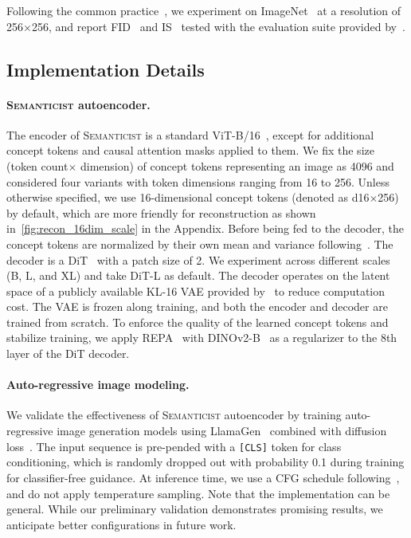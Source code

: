 \documentclass[10pt,twocolumn,letterpaper]{article}
\DeclareRobustCommand{\modelname}{\textsc{Semanticist}\xspace}
\begin{document}
Following the common practice~\cite{mar}, we experiment on ImageNet~\cite{imagenet} at a resolution of 256$\times$256, and report FID~\cite{fid} and IS~\cite{is} tested with the evaluation suite provided by~\cite{dhariwal2021diffusion}.

\subsection{Implementation Details}

\paragraph{\modelname autoencoder.}
The encoder of \modelname is a standard ViT-B/16~\cite{vit}, except for additional concept tokens and causal attention masks applied to them.
We fix the size (token count$\times$ dimension) of concept tokens representing an image as 4096 and considered four variants with token dimensions ranging from 16 to 256. 
Unless otherwise specified, we use 16-dimensional concept tokens (denoted as d16$\times$256) by default, which are more friendly for reconstruction as shown in~\cref{fig:recon_16dim_scale} in the Appendix.
Before being fed to the decoder, the concept tokens are normalized by their own mean and variance following~\cite{RCG}.
The decoder is a DiT~\cite{dit} with a patch size of 2. 
We experiment across different scales (B, L, and XL) and take DiT-L as default. 
The decoder operates on the latent space of a publicly available KL-16 VAE provided by~\cite{mar} to reduce computation cost. 
The VAE is frozen along training, and both the encoder and decoder are trained from scratch.
To enforce the quality of the learned concept tokens and stabilize training, we apply REPA~\cite{repa} with DINOv2-B~\cite{dinov2} as a regularizer to the 8th layer of the DiT decoder.

\paragraph{Auto-regressive image modeling.}
We validate the effectiveness of \modelname autoencoder by training auto-regressive image generation models using LlamaGen~\cite{llamagen} combined with diffusion loss~\cite{mar}. 
The input sequence is pre-pended with a \texttt{[CLS]} token for class conditioning, which is randomly dropped out with probability 0.1 during training for classifier-free guidance. 
At inference time, we use a CFG schedule following~\cite{mar,muse}, and do not apply temperature sampling. 
Note that the implementation can be general. 
While our preliminary validation demonstrates promising results, we anticipate better configurations in future work.
\end{document}

